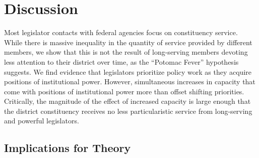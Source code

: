 \documentclass[12pt]{article}
\begin{document}
\section{Discussion} \label{s:discussion}






Most legislator contacts with federal agencies focus on constituency service. While there is massive inequality in the quantity of service provided by different members, we show that this is not the result of long-serving members devoting less attention to their district over time, as the ``Potomac Fever'' hypothesis suggests. We find evidence that legislators prioritize policy work as they acquire positions of institutional power. However, simultaneous increases in capacity that come with positions of institutional power more than offset shifting priorities. Critically, the magnitude of the effect of increased capacity is large enough that the district constituency receives no less particularistic service from long-serving and powerful legislators. 


\subsection{Implications for Theory}
\end{document}
